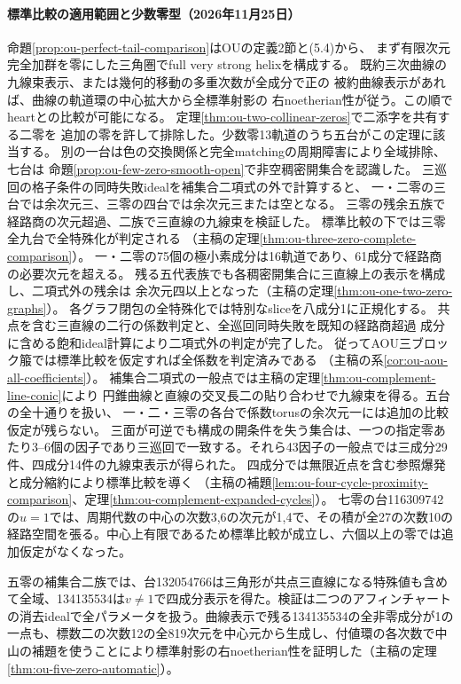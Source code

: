 \documentclass[11pt,a4paper]{ltjsarticle}
\begin{document}
\paragraph{標準比較の適用範囲と少数零型（2026年11月25日）}
命題\ref{prop:ou-perfect-tail-comparison}はOUの定義2節と(5.4)から、
まず有限次元完全加群を零にした三角圏でfull very strong helixを構成する。
既約三次曲線の九線束表示、または幾何的移動の多重次数が全成分で正の
被約曲線表示があれば、曲線の軌道環の中心拡大から全標準射影の
右noetherian性が従う。この順でheartとの比較が可能になる。
定理\ref{thm:ou-two-collinear-zeros}で二添字を共有する二零を
追加の零を許して排除した。少数零13軌道のうち五台がこの定理に該当する。
別の一台は色の交換関係と完全matchingの周期障害により全域排除、七台は
命題\ref{prop:ou-few-zero-smooth-open}で非空稠密開集合を認識した。
三巡回の格子条件の同時失敗idealを補集合二項式の外で計算すると、
一・二零の三台では余次元三、三零の四台では余次元三または空となる。
三零の残余五族で経路商の次元超過、二族で三直線の九線束を検証した。
標準比較の下では三零全九台で全特殊化が判定される
（主稿の定理\ref{thm:ou-three-zero-complete-comparison}）。
一・二零の75個の極小素成分は16軌道であり、61成分で経路商の必要次元を超える。
残る五代表族でも各稠密開集合に三直線上の表示を構成し、二項式外の残余は
余次元四以上となった（主稿の定理\ref{thm:ou-one-two-zero-graphs}）。
各グラフ閉包の全特殊化では特別なsliceを八成分1に正規化する。
共点を含む三直線の二行の係数判定と、全巡回同時失敗を既知の経路商超過
成分に含める飽和ideal計算により二項式外の判定が完了した。
従ってAOU三ブロック箙では標準比較を仮定すれば全係数を判定済みである
（主稿の系\ref{cor:ou-aou-all-coefficients}）。
補集合二項式の一般点では主稿の定理\ref{thm:ou-complement-line-conic}により
円錐曲線と直線の交叉長二の貼り合わせで九線束を得る。五台の全十通りを扱い、
一・二・三零の各台で係数torusの余次元一には追加の比較仮定が残らない。
三面が可逆でも構成の開条件を失う集合は、一つの指定零あたり3–6個の因子であり三巡回で一致する。それら43因子の一般点では三成分29件、四成分14件の九線束表示が得られた。
四成分では無限近点を含む参照爆発と成分縮約により標準比較を導く
（主稿の補題\ref{lem:ou-four-cycle-proximity-comparison}、定理\ref{thm:ou-complement-expanded-cycles}）。
七零の台116309742の$u=1$では、周期代数の中心の次数3,6の次元が1,4で、その積が全27の次数10の経路空間を張る。中心上有限であるため標準比較が成立し、六個以上の零では追加仮定がなくなった。

五零の補集合二族では、台132054766は三角形が共点三直線になる特殊値も含めて全域、134135534は$v\ne1$で四成分表示を得た。検証は二つのアフィンチャートの消去idealで全パラメータを扱う。曲線表示で残る134135534の全非零成分が1の一点も、標数二の次数12の全819次元を中心元から生成し、付値環の各次数で中山の補題を使うことにより標準射影の右noetherian性を証明した（主稿の定理\ref{thm:ou-five-zero-automatic}）。
\end{document}
